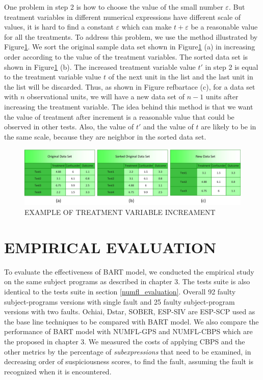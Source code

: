 One problem in step 2 is how to choose the value of the small number $\varepsilon $. But treatment variables in different numerical expressions have different scale of values, it is hard to find a constant $\varepsilon$ which can make $t+\varepsilon$ be a reasonable value for all the treatments. To address this problem, we use the method illustrated by Figure\ref{bartace}.  We sort the original sample data set shown in Figure\ref{bartace} (a) in increasing order according to the value of the treatment variables.  The sorted data set is shown in Figure\ref{bartace} (b). The increased treatment variable value $t'$ in step 2 is equal to the treatment variable value $t$ of the next unit in the list and the last unit in the list will be discarded. Thus, as shown in Figure ref{bartace} (c), for a data set with $n$ observational units, we will have a new data set of $n-1$ units after increasing the treatment variable. The idea behind this method is that we want the value of treatment after increment is a reasonable value that could be observed in  other tests. Also, the value of $t'$ and the value of $t$ are likely to be in the same scale, because they are neighbor in the sorted data set.

\begin{figure}[!thpb]
\centering
\includegraphics[width=1\textwidth]{chapter4_BART_ACE.pdf}
\caption{EXAMPLE OF TREATMENT VARIABLE INCREAMENT}
\label{bartace}
\end{figure}

\section{EMPIRICAL EVALUATION}\label{BARTevaluation}%

To evaluate the effectiveness of BART model, we conducted the empirical study on the same subject programs as described in chapter 3.  The tests suite is also identical to the tests suite in section \ref{numfl_evaluation}.  Overall 92 faulty subject-programs versions with single fault and 25 faulty subject-program versions with two faults. Ochiai, Dstar, SOBER, ESP-SIV are ESP-SCP used as the base line techniques to be compared with BART model. We also compare the performance of BART model with NUMFL-GPS and NUMFL-CBPS which are the proposed in chapter 3. We measured the costs of applying CBPS and the other metrics by the percentage of {\it subexpressions} that need to be examined, in decreasing order of suspiciousness scores, to find the fault, assuming the fault is recognized when it is encountered.

